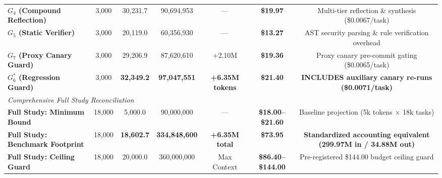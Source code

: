 \begin{table}[t]
\begin{tabular}{lcccccc}
\textbf{$G_4$ (Compound Reflection)} & 3,000 & 30,231.7 & 90,694,953 & --- & \textbf{\$19.97} & Multi-tier reflection \& synthesis (\$0.0067/task) \\
\textbf{$G_5$ (Static Verifier)} & 3,000 & 20,119.0 & 60,356,930 & --- & \textbf{\$13.27} & AST security parsing \& rule verification overhead \\
\textbf{$G_7$ (Proxy Canary Guard)} & 3,000 & 29,206.9 & 87,620,610 & +2.10M & \textbf{\$19.36} & Proxy canary pre-commit gating (\$0.0065/task) \\
\textbf{$G_6^*$ (Regression Guard)} & 3,000 & \textbf{32,349.2} & \textbf{97,047,551} & \textbf{+6.35M tokens} & \textbf{\$21.40} & \textbf{INCLUDES auxiliary canary re-runs (\$0.0071/task)} \\
\midrule
\multicolumn{7}{l}{\textit{Comprehensive Full Study Reconciliation}} \\
\textbf{Full Study: Minimum Bound} & 18,000 & 5,000.0 & 90,000,000 & --- & \textbf{\$18.00--\$21.60} & Baseline projection (5k tokens $\times$ 18k tasks) \\
\textbf{Full Study: Benchmark Footprint} & 18,000 & \textbf{18,602.7} & \textbf{334,848,600} & \textbf{+6.35M total} & \textbf{\$73.95} & \textbf{Standardized accounting equivalent (299.97M in / 34.88M out)} \\
\textbf{Full Study: Ceiling Guard} & 18,000 & 20,000.0 & 360,000,000 & Max Context & \textbf{\$86.40--\$144.00} & Pre-registered \$144.00 budget ceiling guard \\
\bottomrule
\end{tabular}
\end{table}
